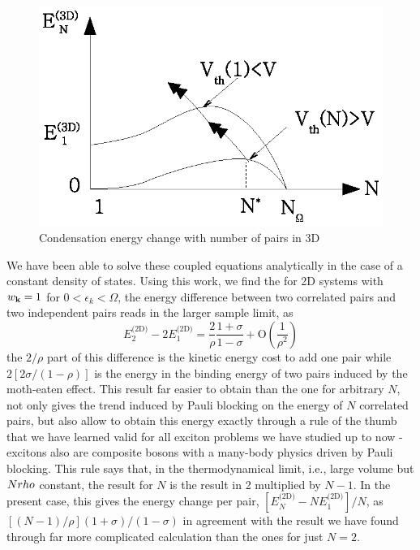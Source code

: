 \documentclass{article}
\newcommand{\td}{{\ensuremath{{\text{(2D)}}}}}
\begin{document}
\begin{figure}[htb]
	\centering
		\includegraphics{3dCondChange.eps}
	\caption{Condensation energy change with number of pairs in 3D}
	\label{fig:3dCondChange}
\end{figure}

We have been able to solve these coupled equations analytically in the case of a constant density of states\cite{twoCooperPair}.  Using this work, we find the for 2D systems with $w_{\mathbf{k}}=1$ for $0<\epsilon_k<\Omega$, the energy difference between two correlated pairs and two independent pairs reads in the larger sample limit, as 
\begin{equation}
E^{\td}_2-2E_1^{\td}=\frac{2}{\rho}\frac{1+\sigma}{1-\sigma}+\text{O}(\frac{1}{\rho^2})
\label{eq:}
\end{equation}
the $2/\rho$ part of this difference is the kinetic energy cost to add one pair while $2[2\sigma/(1-\rho)]$ is the energy in the binding energy of two pairs induced by the moth-eaten effect. This result far easier to obtain than the one for arbitrary $N$, not only gives the trend induced by Pauli blocking on the energy of $N$ correlated pairs, but also allow to obtain this energy exactly through a rule of the thumb that we have learned valid for all exciton problems we have studied up to now -excitons also are composite bosons with a many-body physics driven by Pauli blocking.  This rule says that, in the thermodynamical limit, i.e., large volume but $N\\rho$ constant, the result for $N$ is the result in 2 multiplied by $N-1$.  In the present case, this gives the energy change per pair, $[E^{\td}_N-NE^{\td}_1]/N$, as $[(N-1)/\rho](1+\sigma)/(1-\sigma)$ in agreement with the result we have found through far more complicated calculation than the ones for just $N=2$.
\end{document}
